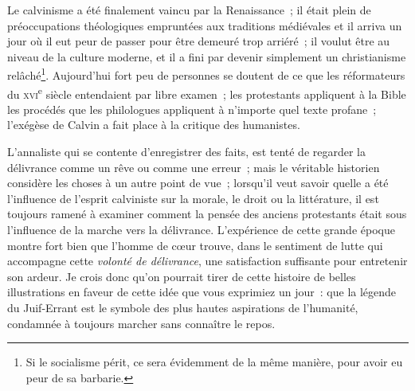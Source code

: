 \documentclass[french,twoside]{book} %
\begin{document}
Le calvinisme a été finalement vaincu par la Renaissance ; il était plein de préoccupations théologiques empruntées aux traditions médiévales et il arriva un jour où il eut peur de passer pour être demeuré trop arriéré ; il voulut être au niveau de la culture moderne, et il a fini par devenir simplement un christianisme relâché\footnote{ \noindent Si le socialisme périt, ce sera évidemment de la même manière, pour avoir eu peur de sa barbarie.
 }. Aujourd’hui fort peu de personnes se doutent de ce que les réformateurs du {\scshape xvi}\textsuperscript{e} siècle entendaient par libre examen ; les protestants appliquent à la Bible les procédés que les philologues appliquent à n’importe quel texte profane ; l’exégèse de Calvin a fait place à la critique des humanistes.\par
L’annaliste qui se contente d’enregistrer des faits, est tenté de regarder la délivrance comme un rêve ou comme une erreur ; mais le véritable historien considère les choses  à un autre point de vue ; lorsqu’il veut savoir quelle a été l’influence de l’esprit calviniste sur la morale, le droit ou la littérature, il est toujours ramené à examiner comment la pensée des anciens protestants était sous l’influence de la marche vers la délivrance. L’expérience de cette grande époque montre fort bien que l’homme de cœur trouve, dans le sentiment de lutte qui accompagne cette \emph{volonté de délivrance}, une satisfaction suffisante pour entretenir son ardeur. Je crois donc qu’on pourrait tirer de cette histoire de belles illustrations en faveur de cette idée que vous exprimiez un jour : que la légende du Juif-Errant est le symbole des plus hautes aspirations de l’humanité, condamnée à toujours marcher sans connaître le repos.
\end{document}
